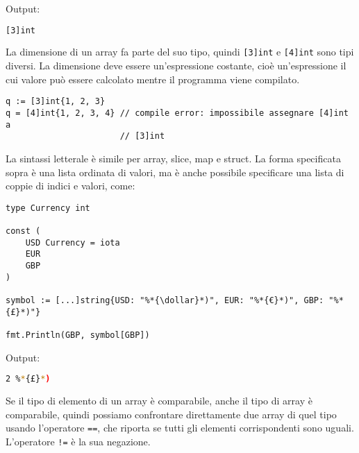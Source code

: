 \documentclass[../../thesis.tex]{subfiles}
\begin{document}
    Output:
    \begin{lstlisting}[language = bash, frame = L, label = {lst:lstlisting3-1.5}]
[3]int
    \end{lstlisting}
    La dimensione di un array fa parte del suo tipo, quindi \verb|[3]int| e \verb|[4]int| sono tipi diversi.
    La dimensione deve essere un'espressione costante, cioè un'espressione il cui valore può essere calcolato mentre il programma viene compilato.
    \begin{lstlisting}[frame = single, label = {lst:lstlisting3-1.6}]
q := [3]int{1, 2, 3}
q = [4]int{1, 2, 3, 4} // compile error: impossibile assegnare [4]int a
                       // [3]int
    \end{lstlisting}
    La sintassi letterale è simile per array, slice, map e struct.
    La forma specificata sopra è una lista ordinata di valori, ma è anche possibile specificare una lista di coppie di indici e valori, come:
    \begin{lstlisting}[frame = single, label = {lst:lstlisting3-1.7}]
type Currency int

const (
    USD Currency = iota
    EUR
    GBP
)

symbol := [...]string{USD: "%*{\dollar}*)", EUR: "%*{€}*)", GBP: "%*{£}*)"}

fmt.Println(GBP, symbol[GBP])
    \end{lstlisting}
    Output:
    \begin{lstlisting}[language = bash, frame = L, label = {lst:lstlisting3-1.8}]
2 %*{£}*)
    \end{lstlisting}
    Se il tipo di elemento di un array è comparabile, anche il tipo di array è comparabile, quindi possiamo confrontare direttamente due array di quel tipo usando l'operatore \verb"==", che riporta se tutti gli elementi corrispondenti sono uguali.
    L'operatore \verb"!=" è la sua negazione.
    \hfill \vspace{12pt}
\end{document}
